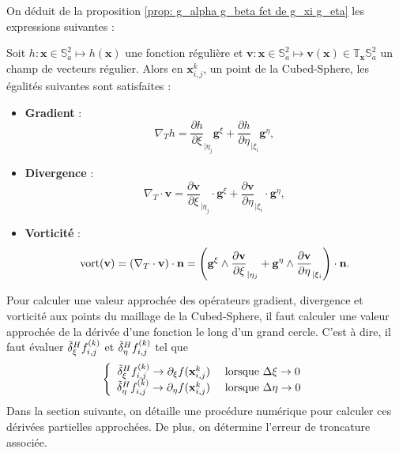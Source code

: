On déduit de la proposition \ref{prop: g_alpha g_beta fct de g_xi g_eta} les expressions suivantes :

\begin{theoreme}
Soit $h : \mathbf{x} \in \mathbb{S}_a^2 \mapsto h(\mathbf{x})$ une fonction régulière et $\mathbf{v} : \mathbf{x} \in \mathbb{S}_a^2 \mapsto \mathbf{v}(\mathbf{x}) \in \mathbb{T}_{\mathbf{x}} \mathbb{S}_a^2$ un champ de vecteurs régulier. Alors en $\mathbf{x}_{i,j}^k$, un point de la Cubed-Sphere, les égalités suivantes sont satisfaites :
\begin{itemize}
\item \textbf{Gradient} :
\begin{equation}
\nabla_T h = \dfrac{\partial h}{\partial \xi}_{|\eta_j} \mathbf{g}^{\xi} + \dfrac{\partial h}{\partial \eta}_{|\xi_i} \mathbf{g}^{\eta},
\end{equation}

\item \textbf{Divergence} :
\begin{equation}
\nabla_T \cdot \mathbf{v} = \dfrac{\partial \mathbf{v}}{\partial \xi}_{|\eta_j} \cdot \mathbf{g}^{\xi} + \dfrac{\partial \mathbf{v}}{\partial \eta}_{|\xi_i} \cdot \mathbf{g}^{\eta},
\label{eq:divergence_v1}
\end{equation}

\item \textbf{Vorticité} :
\begin{equation}
\text{vort}( \mathbf{v} ) = \left( \nabla_T \cdot \mathbf{v} \right) \cdot \mathbf{n} =  \left( \mathbf{g}^{\xi} \wedge \dfrac{\partial \mathbf{v}}{\partial \xi}_{|\eta_j} + \mathbf{g}^{\eta} \wedge \dfrac{\partial \mathbf{v}}{\partial \eta}_{|\xi_i} \right) \cdot \mathbf{n}.
\end{equation}
\end{itemize} 
\end{theoreme}

Pour calculer une valeur approchée des opérateurs gradient, divergence et vorticité aux points du maillage de la Cubed-Sphere, il faut calculer une valeur approchée de la dérivée d'une fonction le long d'un grand cercle. C'est à dire, il faut évaluer $\tilde{\delta}^H_{\xi} f_{i,j}^{(k)}$ et $\tilde{\delta}^H_{\eta} f_{i,j}^{(k)}$ tel que 
\begin{equation}
\left\lbrace
\begin{array}{rl}
\tilde{\delta}^H_{\xi} f_{i,j}^{(k)} \rightarrow \partial_{\xi} f ( \mathbf{x}_{i,j}^k) & \text{ lorsque } \Delta \xi \rightarrow 0\\
\tilde{\delta}^H_{\eta} f_{i,j}^{(k)} \rightarrow \partial_{\eta} f ( \mathbf{x}_{i,j}^k) & \text{ lorsque } \Delta \eta \rightarrow 0
\end{array}
\right.
\end{equation}
Dans la section suivante, on détaille une procédure numérique pour calculer ces dérivées partielles approchées. De plus, on détermine l'erreur de troncature associée.










